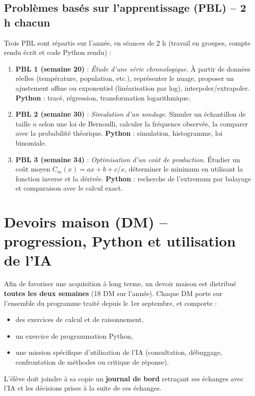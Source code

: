 \documentclass[a4paper,12pt]{article}
\begin{document}
	\subsection{Problèmes basés sur l’apprentissage (PBL) – 2 h chacun}
	Trois PBL sont répartis sur l’année, en séances de 2 h (travail en groupes, compte rendu écrit et code Python rendu) :
	
	\begin{enumerate}
		\item \textbf{PBL 1 (semaine 20)} : \emph{Étude d’une série chronologique}. À partir de données réelles (température, population, etc.), représenter le nuage, proposer un ajustement affine ou exponentiel (linéarisation par log), interpoler/extrapoler. \textbf{Python} : tracé, régression, transformation logarithmique.
		\item \textbf{PBL 2 (semaine 30)} : \emph{Simulation d’un sondage}. Simuler un échantillon de taille $n$ selon une loi de Bernoulli, calculer la fréquence observée, la comparer avec la probabilité théorique. \textbf{Python} : simulation, histogramme, loi binomiale.
		\item \textbf{PBL 3 (semaine 34)} : \emph{Optimisation d’un coût de production}. Étudier un coût moyen $C_m(x) = ax + b + c/x$, déterminer le minimum en utilisant la fonction inverse et la dérivée. \textbf{Python} : recherche de l’extremum par balayage et comparaison avec le calcul exact.
	\end{enumerate}
	
	\section{Devoirs maison (DM) -- progression, Python et utilisation de l’IA}
	
	Afin de favoriser une acquisition à long terme, un devoir maison est distribué \textbf{toutes les deux semaines} (18 DM sur l’année).  
	Chaque DM porte sur l’ensemble du programme traité depuis le 1er septembre, et comporte :
	\begin{itemize}
		\item des exercices de calcul et de raisonnement,
		\item un exercice de programmation Python,
		\item une mission spécifique d’utilisation de l’IA (consultation, débuggage, confrontation de méthodes ou critique de réponse).
	\end{itemize}
	
	L’élève doit joindre à sa copie un \textbf{journal de bord} retraçant ses échanges avec l’IA et les décisions prises à la suite de ces échanges.
	
\end{document}
